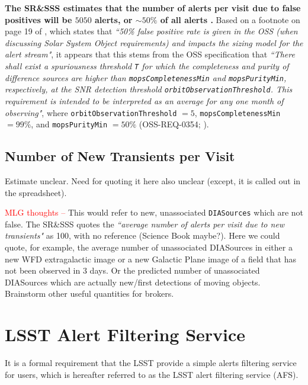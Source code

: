 \documentclass[DM,authoryear,toc]{lsstdoc}
\begin{document}
{\bf The SR\&SSS estimates that the number of alerts per visit due to false positives will be $5050$ alerts, or $\sim50\%$ of all alerts .} Based on a footnote on page 19 of , which states that {\it ``50\% false positive rate is given in the OSS (when discussing Solar System Object requirements) and impacts the sizing model for the alert stream"}, it appears that this stems from the OSS specification that {\it ``There shall exist a spuriousness threshold {\tt T} for which the completeness and purity of difference sources are higher than {\tt mopsCompletenessMin} and {\tt mopsPurityMin}, respectively, at the SNR detection threshold {\tt orbitObservationThreshold}. This requirement is intended to be interpreted as an average for any one month of observing"}, where {\tt orbitObservationThreshold} $=5$, {\tt mopsCompletenessMin} $=99\%$, and {\tt mopsPurityMin} $=50\%$ (OSS-REQ-0354; ).


\subsection{Number of New Transients per Visit}

Estimate unclear. Need for quoting it here also unclear (except, it is called out in the spreadsheet).

\textcolor{red}{MLG thoughts --} This would refer to new, unassociated {\tt DIASources} which are not false. The SR\&SSS quotes the {\it ``average number of alerts per visit due to new transients"} as 100, with no reference (Science Book maybe?). Here we could quote, for example, the average number of unassociated DIASources in either a new WFD extragalactic image or a new Galactic Plane image of a field that has not been observed in $3$ days. Or the predicted number of unassociated DIASources which are actually new/first detections of moving objects. Brainstorm other useful quantities for brokers.



\section{LSST Alert Filtering Service} \label{sec:LAFS}

It is a formal requirement that the LSST provide a simple alerts filtering service for users, which is hereafter referred to as the LSST alert filtering service (AFS).
\end{document}
